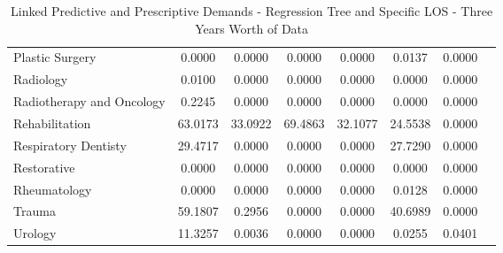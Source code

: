 \documentclass[thesis.tex]{subfiles}
\begin{document}
\begin{table}[h!]
{\begin{tabular}{lccccccc}
Plastic Surgery&0.0000&	0.0000&	0.0000&	0.0000&	0.0137&	0.0000\\
Radiology&0.0100&	0.0000&	0.0000&	0.0000&	0.0000&	0.0000\\
Radiotherapy and Oncology &0.2245&	0.0000&	0.0000&	0.0000&	0.0000&	0.0000\\
Rehabilitation&63.0173&	33.0922&	69.4863&	32.1077&	24.5538&	0.0000\\
Respiratory Dentisty&29.4717&	0.0000&	0.0000&	0.0000&	27.7290&	0.0000\\
Restorative&0.0000&	0.0000&	0.0000&	0.0000&	0.0000&	0.0000\\
Rheumatology&0.0000&	0.0000&	0.0000&	0.0000&	0.0128&	0.0000\\
Trauma&59.1807&	0.2956&	0.0000&	0.0000&	40.6989&	0.0000\\
Urology&11.3257&	0.0036&	0.0000&	0.0000&	0.0255&	0.0401\\

\bottomrule
    \end{tabular}}
    \caption{Linked Predictive and Prescriptive Demands - Regression Tree and Specific LOS - Three Years Worth of Data}
    \label{apptab:LinkedDemands4}
\end{table}
\end{document}
